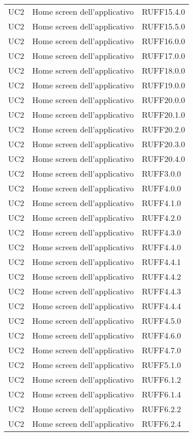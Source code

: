 \begin{longtable}{lp{}l}
UC2 & Home screen dell'applicativo & RUFF15.4.0 \\
UC2 & Home screen dell'applicativo & RUFF15.5.0 \\
UC2 & Home screen dell'applicativo & RUFF16.0.0 \\
UC2 & Home screen dell'applicativo & RUFF17.0.0 \\
UC2 & Home screen dell'applicativo & RUFF18.0.0 \\
UC2 & Home screen dell'applicativo & RUFF19.0.0 \\
UC2 & Home screen dell'applicativo & RUFF20.0.0 \\
UC2 & Home screen dell'applicativo & RUFF20.1.0 \\
UC2 & Home screen dell'applicativo & RUFF20.2.0 \\
UC2 & Home screen dell'applicativo & RUFF20.3.0 \\
UC2 & Home screen dell'applicativo & RUFF20.4.0 \\
UC2 & Home screen dell'applicativo & RUFF3.0.0 \\
UC2 & Home screen dell'applicativo & RUFF4.0.0 \\
UC2 & Home screen dell'applicativo & RUFF4.1.0 \\
UC2 & Home screen dell'applicativo & RUFF4.2.0 \\
UC2 & Home screen dell'applicativo & RUFF4.3.0 \\
UC2 & Home screen dell'applicativo & RUFF4.4.0 \\
UC2 & Home screen dell'applicativo & RUFF4.4.1 \\
UC2 & Home screen dell'applicativo & RUFF4.4.2 \\
UC2 & Home screen dell'applicativo & RUFF4.4.3 \\
UC2 & Home screen dell'applicativo & RUFF4.4.4 \\
UC2 & Home screen dell'applicativo & RUFF4.5.0 \\
UC2 & Home screen dell'applicativo & RUFF4.6.0 \\
UC2 & Home screen dell'applicativo & RUFF4.7.0 \\
UC2 & Home screen dell'applicativo & RUFF5.1.0 \\
UC2 & Home screen dell'applicativo & RUFF6.1.2 \\
UC2 & Home screen dell'applicativo & RUFF6.1.4 \\
UC2 & Home screen dell'applicativo & RUFF6.2.2 \\
UC2 & Home screen dell'applicativo & RUFF6.2.4 \\

\end{longtable}
